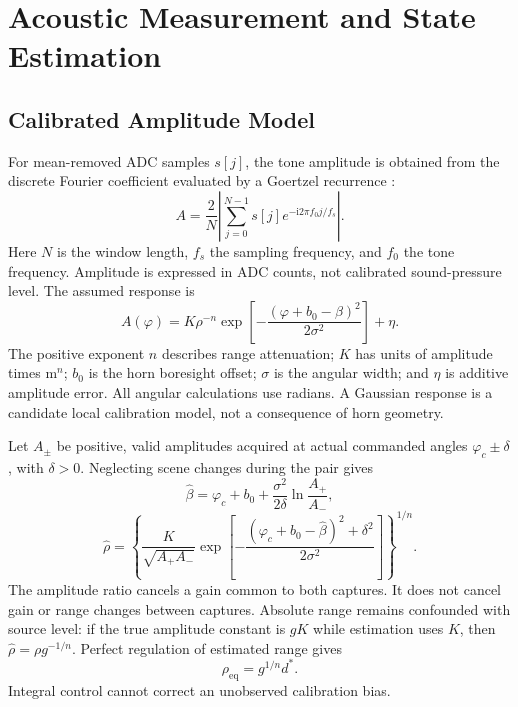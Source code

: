 \section{Acoustic Measurement and State Estimation}
\label{sec:sensing}
\subsection{Calibrated Amplitude Model}
For mean-removed ADC samples $s[j]$, the tone amplitude is obtained from the discrete Fourier coefficient evaluated by a Goertzel recurrence \cite{goertzel}:
\begin{equation}
A=\frac{2}{N}\left|\sum_{j=0}^{N-1}s[j]e^{-\mathrm{i}2\pi f_0j/f_s}\right|.
\label{eq:goertzel}
\end{equation}
Here $N$ is the window length, $f_s$ the sampling frequency, and $f_0$ the tone frequency. Amplitude is expressed in ADC counts, not calibrated sound-pressure level. The assumed response is
\begin{equation}
A(\varphi)=K\rho^{-n}\exp\!\left[-\frac{(\varphi+b_0-\beta)^2}{2\sigma^2}\right]+\eta.
\label{eq:amp}
\end{equation}
The positive exponent $n$ describes range attenuation; $K$ has units of amplitude times $\mathrm{m}^{n}$; $b_0$ is the horn boresight offset; $\sigma$ is the angular width; and $\eta$ is additive amplitude error. All angular calculations use radians. A Gaussian response is a candidate local calibration model, not a consequence of horn geometry.

Let $A_\pm$ be positive, valid amplitudes acquired at actual commanded angles $\varphi_c\pm\delta$, with $\delta>0$. Neglecting scene changes during the pair gives
\begin{equation}
\hat\beta=\varphi_c+b_0+\frac{\sigma^2}{2\delta}\ln\frac{A_+}{A_-},
\label{eq:beta}
\end{equation}
\begin{equation}
\hat\rho=\left\{\frac{K}{\sqrt{A_+A_-}}
\exp\!\left[-\frac{(\varphi_c+b_0-\hat\beta)^2+\delta^2}{2\sigma^2}\right]\right\}^{1/n}.
\label{eq:rho}
\end{equation}
The amplitude ratio cancels a gain common to both captures. It does not cancel gain or range changes between captures. Absolute range remains confounded with source level: if the true amplitude constant is $gK$ while estimation uses $K$, then $\hat\rho=\rho g^{-1/n}$. Perfect regulation of estimated range gives
\begin{equation}
\rho_{\mathrm{eq}}=g^{1/n}d^\ast.
\label{eq:gainbias}
\end{equation}
Integral control cannot correct an unobserved calibration bias.

